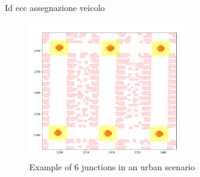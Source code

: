 		Id ecc assegnazione veicolo
	
		\begin{figure}[H]
			\centering
			\includegraphics[width=0.6\textwidth]{immagini/junction-example}
			\caption{Example of 6 junctions in an urban scenario}
			\label{fig:junction-example}
		\end{figure}
		
